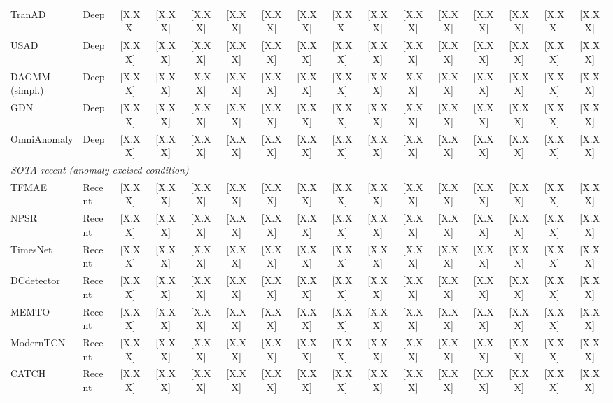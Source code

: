 \begin{table}[t]
\begin{adjustbox}{max width=\linewidth}
\begin{tabular}{l@{\hspace{4pt}}l@{\hspace{3pt}}cccccccccccccc}
TranAD         & Deep & {[X.XX]} & {[X.XX]} & {[X.XX]} & {[X.XX]} & {[X.XX]} & {[X.XX]} & {[X.XX]} & {[X.XX]} & {[X.XX]} & {[X.XX]} & {[X.XX]} & {[X.XX]} & {[X.XX]} & {[X.XX]} \\
USAD           & Deep & {[X.XX]} & {[X.XX]} & {[X.XX]} & {[X.XX]} & {[X.XX]} & {[X.XX]} & {[X.XX]} & {[X.XX]} & {[X.XX]} & {[X.XX]} & {[X.XX]} & {[X.XX]} & {[X.XX]} & {[X.XX]} \\
DAGMM (simpl.) & Deep & {[X.XX]} & {[X.XX]} & {[X.XX]} & {[X.XX]} & {[X.XX]} & {[X.XX]} & {[X.XX]} & {[X.XX]} & {[X.XX]} & {[X.XX]} & {[X.XX]} & {[X.XX]} & {[X.XX]} & {[X.XX]} \\
GDN            & Deep & {[X.XX]} & {[X.XX]} & {[X.XX]} & {[X.XX]} & {[X.XX]} & {[X.XX]} & {[X.XX]} & {[X.XX]} & {[X.XX]} & {[X.XX]} & {[X.XX]} & {[X.XX]} & {[X.XX]} & {[X.XX]} \\
OmniAnomaly    & Deep & {[X.XX]} & {[X.XX]} & {[X.XX]} & {[X.XX]} & {[X.XX]} & {[X.XX]} & {[X.XX]} & {[X.XX]} & {[X.XX]} & {[X.XX]} & {[X.XX]} & {[X.XX]} & {[X.XX]} & {[X.XX]} \\
\midrule
\multicolumn{16}{l}{\textit{SOTA recent (anomaly-excised condition)}} \\
TFMAE          & Recent & {[X.XX]} & {[X.XX]} & {[X.XX]} & {[X.XX]} & {[X.XX]} & {[X.XX]} & {[X.XX]} & {[X.XX]} & {[X.XX]} & {[X.XX]} & {[X.XX]} & {[X.XX]} & {[X.XX]} & {[X.XX]} \\
NPSR           & Recent & {[X.XX]} & {[X.XX]} & {[X.XX]} & {[X.XX]} & {[X.XX]} & {[X.XX]} & {[X.XX]} & {[X.XX]} & {[X.XX]} & {[X.XX]} & {[X.XX]} & {[X.XX]} & {[X.XX]} & {[X.XX]} \\
TimesNet       & Recent & {[X.XX]} & {[X.XX]} & {[X.XX]} & {[X.XX]} & {[X.XX]} & {[X.XX]} & {[X.XX]} & {[X.XX]} & {[X.XX]} & {[X.XX]} & {[X.XX]} & {[X.XX]} & {[X.XX]} & {[X.XX]} \\
DCdetector     & Recent & {[X.XX]} & {[X.XX]} & {[X.XX]} & {[X.XX]} & {[X.XX]} & {[X.XX]} & {[X.XX]} & {[X.XX]} & {[X.XX]} & {[X.XX]} & {[X.XX]} & {[X.XX]} & {[X.XX]} & {[X.XX]} \\
MEMTO          & Recent & {[X.XX]} & {[X.XX]} & {[X.XX]} & {[X.XX]} & {[X.XX]} & {[X.XX]} & {[X.XX]} & {[X.XX]} & {[X.XX]} & {[X.XX]} & {[X.XX]} & {[X.XX]} & {[X.XX]} & {[X.XX]} \\
ModernTCN      & Recent & {[X.XX]} & {[X.XX]} & {[X.XX]} & {[X.XX]} & {[X.XX]} & {[X.XX]} & {[X.XX]} & {[X.XX]} & {[X.XX]} & {[X.XX]} & {[X.XX]} & {[X.XX]} & {[X.XX]} & {[X.XX]} \\
CATCH          & Recent & {[X.XX]} & {[X.XX]} & {[X.XX]} & {[X.XX]} & {[X.XX]} & {[X.XX]} & {[X.XX]} & {[X.XX]} & {[X.XX]} & {[X.XX]} & {[X.XX]} & {[X.XX]} & {[X.XX]} & {[X.XX]} \\

\end{tabular}
\end{adjustbox}
\end{table}
